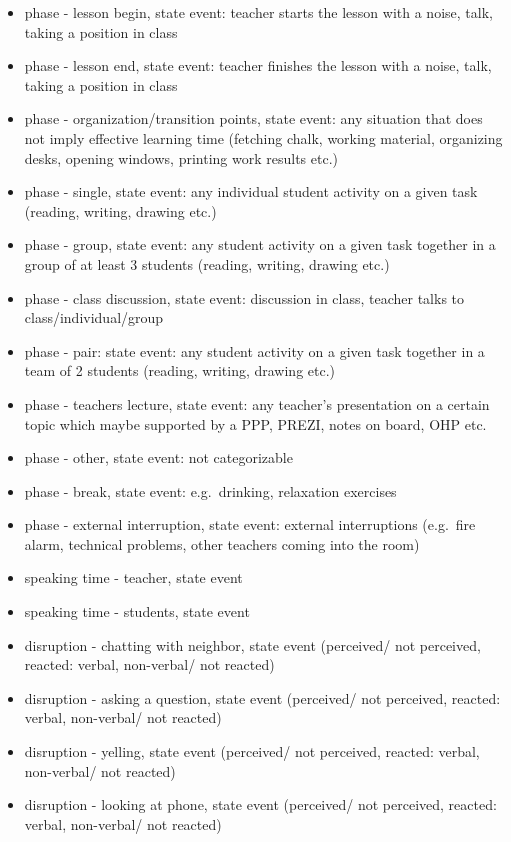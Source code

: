 \documentclass[
  english,
  man,floatsintext]{apa6}
\begin{document}
\begin{itemize}
\item
  phase - lesson begin, state event: teacher starts the lesson with a noise, talk, taking a position in class
\item
  phase - lesson end, state event: teacher finishes the lesson with a noise, talk, taking a position in class
\item
  phase - organization/transition points, state event: any situation that does not imply effective learning time (fetching chalk, working material, organizing desks, opening windows, printing work results etc.)
\item
  phase - single, state event: any individual student activity on a given task (reading, writing, drawing etc.)
\item
  phase - group, state event: any student activity on a given task together in a group of at least 3 students (reading, writing, drawing etc.)
\item
  phase - class discussion, state event: discussion in class, teacher talks to class/individual/group
\item
  phase - pair: state event: any student activity on a given task together in a team of 2 students (reading, writing, drawing etc.)
\item
  phase - teachers lecture, state event: any teacher's presentation on a certain topic which maybe supported by a PPP, PREZI, notes on board, OHP etc.
\item
  phase - other, state event: not categorizable
\item
  phase - break, state event: e.g.~drinking, relaxation exercises
\item
  phase - external interruption, state event: external interruptions (e.g.~fire alarm, technical problems, other teachers coming into the room)
\item
  speaking time - teacher, state event
\item
  speaking time - students, state event
\item
  disruption - chatting with neighbor, state event (perceived/ not perceived, reacted: verbal, non-verbal/ not reacted)
\item
  disruption - asking a question, state event (perceived/ not perceived, reacted: verbal, non-verbal/ not reacted)
\item
  disruption - yelling, state event (perceived/ not perceived, reacted: verbal, non-verbal/ not reacted)
\item
  disruption - looking at phone, state event (perceived/ not perceived, reacted: verbal, non-verbal/ not reacted)

\end{itemize}
\end{document}

